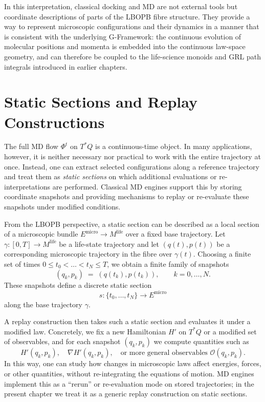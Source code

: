 \documentclass[11pt]{book}
\theoremstyle{plain}
\theoremstyle{definition}
\theoremstyle{remark}
\begin{document}
In this interpretation, classical docking and MD are not external
tools but coordinate descriptions of parts of the LBOPB fibre
structure. They provide a way to represent microscopic configurations
and their dynamics in a manner that is consistent with the underlying
G-Framework: the continuous evolution of molecular positions and
momenta is embedded into the continuous law-space geometry, and can
therefore be coupled to the life-science monoids and GRL path integrals
introduced in earlier chapters.

\section{Static Sections and Replay Constructions}


The full MD flow $\Phi^{t}$ on $T^{*}Q$ is a continuous-time object.
In many applications, however, it is neither necessary nor practical
to work with the entire trajectory at once. Instead, one can extract
selected configurations along a reference trajectory and treat them
as \emph{static sections} on which additional evaluations or
re-interpretations are performed. Classical MD engines support this by
storing coordinate snapshots and providing mechanisms to replay or
re-evaluate these snapshots under modified conditions.

From the LBOPB perspective, a static section can be described as a
local section of a microscopic bundle $E^{\mathrm{micro}} \to
M^{\mathrm{life}}$ over a fixed base trajectory. Let
$\gamma \colon [0,T] \to M^{\mathrm{life}}$ be a life-state trajectory
and let $(q(t),p(t))$ be a corresponding microscopic trajectory in
the fibre over $\gamma(t)$. Choosing a finite set of times
$0 \le t_{0} < \dots < t_{N} \le T$, we obtain a finite family of
snapshots
\[
  (q_{k}, p_{k}) \;=\; (q(t_{k}), p(t_{k})),
  \qquad k = 0,\dots,N.
\]
These snapshots define a discrete static section
\[
  s \colon \{t_{0},\dots,t_{N}\} \to E^{\mathrm{micro}}
\]
along the base trajectory $\gamma$.

A replay construction then takes such a static section and evaluates
it under a modified law. Concretely, we fix a new Hamiltonian
$H'$ on $T^{*}Q$ or a modified set of observables, and for each
snapshot $(q_{k},p_{k})$ we compute quantities such as
\[
  H'(q_{k},p_{k}), \quad
  \nabla H'(q_{k},p_{k}), \quad
  \text{or more general observables } \mathcal{O}(q_{k},p_{k}).
\]
In this way, one can study how changes in microscopic laws affect
energies, forces, or other quantities, without re-integrating the
equations of motion. MD engines implement this as a “rerun” or
re-evaluation mode on stored trajectories; in the present chapter we
treat it as a generic replay construction on static sections.
\end{document}
